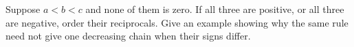 Suppose $a<b<c$ and none of them is zero. If all three are positive, or all three are negative, order their reciprocals. Give an example showing why the same rule need not give one decreasing chain when their signs differ.
